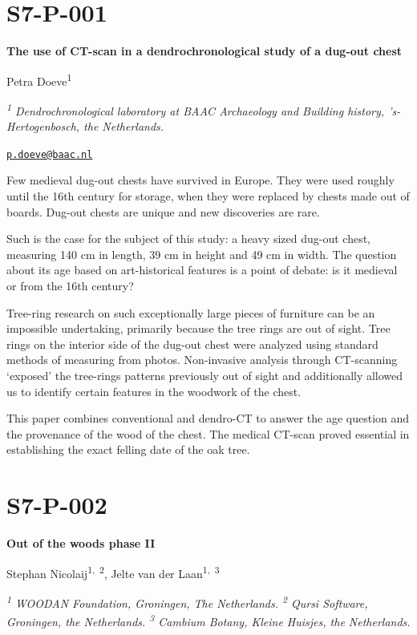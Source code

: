 \documentclass[
]{book}
\begin{document}
\hypertarget{s7-p-001}{%
\section*{S7-P-001}\label{s7-p-001}}

\textbf{The use of CT-scan in a dendrochronological study of a dug-out chest}

Petra Doeve\textsuperscript{1}

\emph{\textsuperscript{1} Dendrochronological laboratory at BAAC Archaeology and Building history, 's-Hertogenbosch, the Netherlands.}

\href{mailto:p.doeve@baac.nl}{\nolinkurl{p.doeve@baac.nl}}

Few medieval dug-out chests have survived in Europe. They were used roughly until the 16th century for storage, when they were replaced by chests made out of boards. Dug-out chests are unique and new discoveries are rare.

Such is the case for the subject of this study: a heavy sized dug-out chest, measuring 140 cm in length, 39 cm in height and 49 cm in width. The question about its age based on art-historical features is a point of debate: is it medieval or from the 16th century?

Tree-ring research on such exceptionally large pieces of furniture can be an impossible undertaking, primarily because the tree rings are out of sight. Tree rings on the interior side of the dug-out chest were analyzed using standard methods of measuring from photos. Non-invasive analysis through CT-scanning `exposed' the tree-rings patterns previously out of sight and additionally allowed us to identify certain features in the woodwork of the chest.

This paper combines conventional and dendro-CT to answer the age question and the provenance of the wood of the chest. The medical CT-scan proved essential in establishing the exact felling date of the oak tree.

\hypertarget{s7-p-002}{%
\section*{S7-P-002}\label{s7-p-002}}

\textbf{Out of the woods phase II}

Stephan Nicolaij\textsuperscript{1,~2}, Jelte van der Laan\textsuperscript{1,~3}

\emph{\textsuperscript{1} WOODAN Foundation, Groningen, The Netherlands. \textsuperscript{2} Qursi Software, Groningen, the Netherlands. \textsuperscript{3} Cambium Botany, Kleine Huisjes, the Netherlands.}
\end{document}

